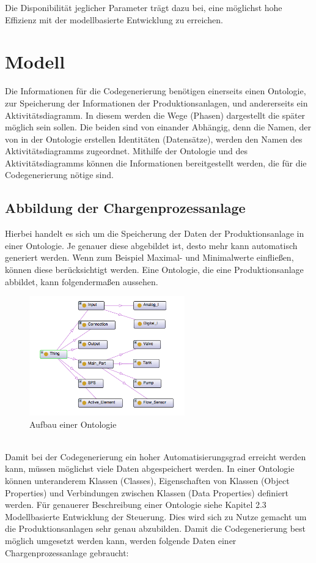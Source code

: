 Die Dis­po­ni­bi­li­tät jeglicher Parameter trägt dazu bei, eine möglichst hohe Effizienz mit der modellbasierte Entwicklung zu erreichen.\\

\section{Modell}
Die Informationen für die Codegenerierung benötigen einerseits einen Ontologie, zur Speicherung der Informationen der Produktionsanlagen,  und andererseits ein Aktivitätsdiagramm. In diesem werden die Wege (Phasen) dargestellt die später möglich sein sollen.
Die beiden sind von einander Abhängig, denn die Namen, der von in der Ontologie erstellen Identitäten (Datensätze), werden den Namen des Aktivitätsdiagramms zugeordnet.
Mithilfe der Ontologie und des Aktivitätsdiagramms können die Informationen bereitgestellt werden, die für die Codegenerierung nötige sind.  

\subsection{Abbildung der Chargenprozessanlage}
Hierbei handelt es sich um die Speicherung der Daten der Produktionsanlage in einer Ontologie. Je genauer diese abgebildet ist, desto mehr kann automatisch generiert werden. Wenn zum Beispiel Maximal- und Minimalwerte einfließen, können diese berücksichtigt werden.
Eine Ontologie, die eine Produktionsanlage abbildet, kann folgendermaßen aussehen. 
\begin{figure}[hbt!]
 \centering
  \includegraphics[width=0.6\textwidth]{graphics/stateoftheart/Ontology_Aufbau}
  \caption{Aufbau einer Ontologie}
\end{figure}\\
Damit bei der Codegenerierung ein hoher Automatisierungsgrad  erreicht werden kann, müssen möglichst viele Daten abgespeichert werden. In einer Ontologie können unteranderem Klassen (Classes), Eigenschaften von Klassen (Object Properties) und Verbindungen zwischen Klassen (Data Properties) definiert werden. Für genauerer Beschreibung einer Ontologie siehe Kapitel 2.3 \glqq Modellbasierte Entwicklung der Steuerung\grqq. Dies wird sich zu Nutze gemacht um die Produktionsanlagen sehr genau abzubilden. Damit die Codegenerierung best möglich umgesetzt werden kann, werden folgende Daten einer Chargenprozessanlage gebraucht:

